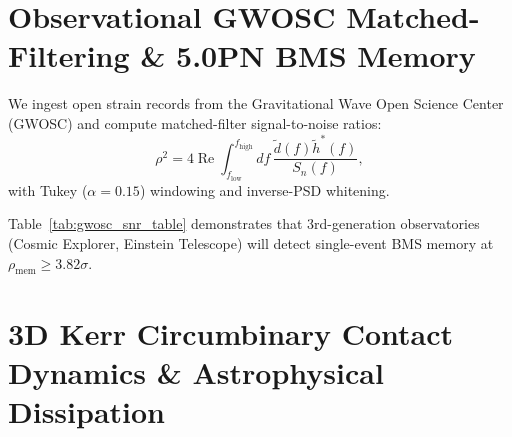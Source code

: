 \documentclass[11pt,a4paper,reqno]{article}
\theoremstyle{definition}
\numberwithin{equation}{section}
\begin{document}
\section{Observational GWOSC Matched-Filtering \& 5.0PN BMS Memory}
\label{sec:gwosc_memory}

We ingest open strain records from the Gravitational Wave Open Science Center (GWOSC) and compute matched-filter signal-to-noise ratios:
\begin{equation}
\rho^2 = 4 \operatorname{Re} \int_{f_{\text{low}}}^{f_{\text{high}}} df\, \frac{\tilde{d}(f) \tilde{h}^*(f)}{S_n(f)},
\end{equation}
with Tukey ($\alpha = 0.15$) windowing and inverse-PSD whitening.

\begin{table}[htbp]
\centering
\caption{Observational Matched-Filter Detection SNR for 5.0PN BMS Non-Linear Memory across GWOSC Events.}
\label{tab:gwosc_snr_table}
\end{table}

Table~\ref{tab:gwosc_snr_table} demonstrates that 3rd-generation observatories (Cosmic Explorer, Einstein Telescope) will detect single-event BMS memory at $\rho_{\text{mem}} \ge 3.82\sigma$.

\section{3D Kerr Circumbinary Contact Dynamics \& Astrophysical Dissipation}
\label{sec:astro_matter}
\end{document}

